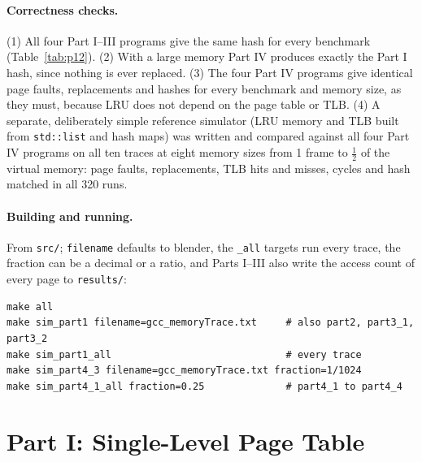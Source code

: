 \documentclass[11pt,a4paper]{article}
\begin{document}
\paragraph{Correctness checks.} (1) All four Part I--III programs give the same hash for every
benchmark (Table~\ref{tab:p12}). (2) With a large memory Part IV produces exactly the Part I hash,
since nothing is ever replaced. (3) The four Part IV programs give identical page faults,
replacements and hashes for every benchmark and memory size, as they must, because LRU does not
depend on the page table or TLB. (4) A separate, deliberately simple reference simulator (LRU memory
and TLB built from \texttt{std::list} and hash maps) was written and compared against all four
Part IV programs on all ten traces at eight memory sizes from 1 frame to $\frac{1}{2}$ of the
virtual memory: page faults, replacements, TLB hits and misses, cycles and hash matched in all
320 runs.

\paragraph{Building and running.} From \texttt{src/}; \texttt{filename} defaults to blender, the
\texttt{\_all} targets run every trace, the fraction can be a decimal or a ratio, and Parts I--III
also write the access count of every page to \texttt{results/}:
{\small
\begin{verbatim}
make all
make sim_part1 filename=gcc_memoryTrace.txt     # also part2, part3_1, part3_2
make sim_part1_all                              # every trace
make sim_part4_3 filename=gcc_memoryTrace.txt fraction=1/1024
make sim_part4_1_all fraction=0.25              # part4_1 to part4_4
\end{verbatim}}

\section{Part I: Single-Level Page Table}
\end{document}
